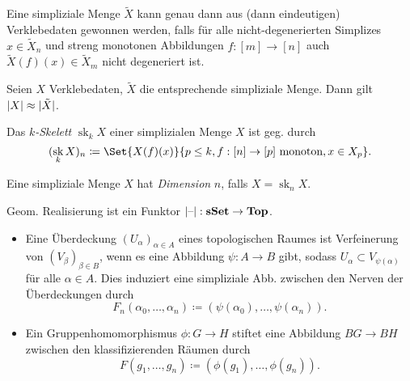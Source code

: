 \documentclass{cheat-sheet}
\newcommand{\sSet}{\mathbf{sSet}} %
\newcommand{\Top}{\mathbf{Top}} %
\DeclareMathOperator{\sk}{sk} %
\begin{document}
\begin{prop}
  Eine simpliziale Menge $\tilde{X}$ kann genau dann aus (dann eindeutigen) Verklebedaten gewonnen werden, falls für alle nicht-degenerierten Simplizes $x \in \tilde{X}_n$ und streng monotonen Abbildungen $f : [m] \to [n]$ auch $\tilde{X}(f)(x) \in \tilde{X}_m$ nicht degeneriert ist.
\end{prop}


\begin{prop}
  Seien $X$ Verklebedaten, $\tilde{X}$ die entsprechende simpliziale Menge. Dann gilt $\lvert X\rvert \approx \lvert\tilde{X}\rvert$.
\end{prop}

\begin{defn}
  Das \emph{$k$-Skelett} $\sk_k X$ einer simplizialen Menge $X$ ist geg. durch
  \[ (\sk_k X)_n \coloneqq \Set{ X(f)(x) }{ p \leq k, f : [n] \to [p] \text{ monoton}, x \in X_p }. \]
\end{defn}

\begin{defn}
  Eine simpliziale Menge $X$ hat \emph{Dimension} $n$, falls $X = \sk_n X$.
\end{defn}

\begin{prop}
  Geom. Realisierung ist ein Funktor $\abs{\blank} : \sSet \to \Top$.
\end{prop}

\begin{bspe}
  \begin{itemize}
    \item Eine Überdeckung $(U_\alpha)_{\alpha \in A}$ eines topologischen Raumes ist Verfeinerung von $(V_\beta)_{\beta \in B}$, wenn es eine Abbildung $\psi : A \to B$ gibt, sodass $U_\alpha \subset V_{\psi(\alpha)}$ für alle $\alpha \in A$. Dies induziert eine simpliziale Abb. zwischen den Nerven der Überdeckungen durch
    \[ F_n(\alpha_0, \ldots, \alpha_n) \coloneqq (\psi(\alpha_0), \ldots, \psi(\alpha_n)). \]
    \item Ein Gruppenhomomorphismus $\phi : G \to H$ stiftet eine Abbildung $BG \to BH$ zwischen den klassifizierenden Räumen durch
    \[ F(g_1, \ldots, g_n) \coloneqq (\phi(g_1), \ldots, \phi(g_n)). \]
  \end{itemize}
\end{bspe}

\end{document}
